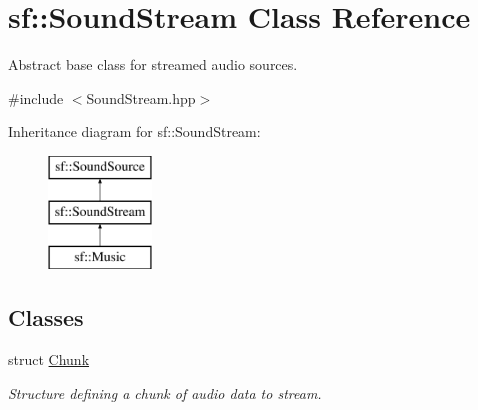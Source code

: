 \hypertarget{classsf_1_1SoundStream}{\section{sf\-:\-:Sound\-Stream Class Reference}
\label{classsf_1_1SoundStream}
}


Abstract base class for streamed audio sources.  




{\ttfamily \#include $<$Sound\-Stream.\-hpp$>$}

Inheritance diagram for sf\-:\-:Sound\-Stream\-:\begin{figure}[H]
\begin{center}
\leavevmode
\includegraphics[height=3.000000cm]{classsf_1_1SoundStream}
\end{center}
\end{figure}
\subsection*{Classes}
\begin{DoxyCompactItemize}
\item 
struct \hyperlink{structsf_1_1SoundStream_1_1Chunk}{Chunk}
\begin{DoxyCompactList}\small\item\em Structure defining a chunk of audio data to stream. \end{DoxyCompactList}\end{DoxyCompactItemize}
